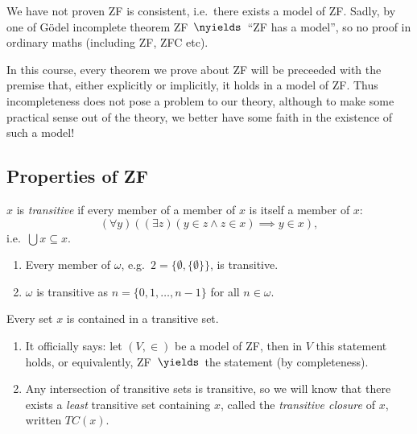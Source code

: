 \documentclass[a4paper]{article}
\begin{document}
\begin{remark}
  We have not proven ZF is consistent, i.e.\ there exists a model of ZF. Sadly, by one of Gödel incomplete theorem ZF~\(\nyields\)~``ZF has a model'', so no proof in ordinary maths (including ZF, ZFC etc).
\end{remark}

In this course, every theorem we prove about ZF will be preceeded with the premise that, either explicitly or implicitly, it holds in a model of ZF. Thus incompleteness does not pose a problem to our theory, although to make some practical sense out of the theory, we better have some faith in the existence of such a model!

\subsection{Properties of ZF}

\begin{definition}[Transitive]
  \(x\) is \emph{transitive} if every member of a member of \(x\) is itself a member of \(x\):
  \[
    (\forall y) ((\exists z) (y \in z \land z \in x) \implies y \in x),
  \]
  i.e.\ \(\bigcup x \subseteq x\).
\end{definition}

\begin{eg}\leavevmode
  \begin{enumerate}
  \item Every member of \(\omega\), e.g.\ \(2 = \{\emptyset, \{\emptyset\}\}\), is transitive.
  \item \(\omega\) is transitive as \(n = \{0, 1, \dots, n - 1\}\) for all \(n \in \omega\).
  \end{enumerate}
\end{eg}

\begin{lemma}
  Every set \(x\) is contained in a transitive set.
\end{lemma}

\begin{remark}\leavevmode
  \begin{enumerate}
  \item It officially says: let \((V, \in)\) be a model of ZF, then in \(V\) this statement holds, or equivalently, ZF~\(\yields\)~the statement (by completeness).
  \item Any intersection of transitive sets is transitive, so we will know that there exists a \emph{least} transitive set containing \(x\), called the \emph{transitive closure} of \(x\), written \(TC(x)\).
  \end{enumerate}
\end{remark}
\end{document}
